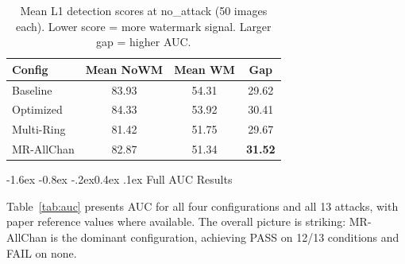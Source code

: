 \documentclass[10pt,twocolumn]{article}
\makeatletter
\renewcommand\subsection{\@startsection{subsection}{2}{\z@}%
  {-1.6ex \@plus -0.8ex \@minus -.2ex}{0.4ex \@plus .1ex}%
  {\normalfont\normalsize\itshape}}
\makeatother
\begin{document}
\begin{table}[htbp]
  \centering
  \caption{Mean L1 detection scores at no\_attack (50 images each).
    Lower score = more watermark signal. Larger gap = higher AUC.}
  \label{tab:scores}
  \setlength{\tabcolsep}{4pt}
  \small
  \begin{tabular}{lccc}
    \toprule
    \textbf{Config} & \textbf{Mean NoWM} & \textbf{Mean WM} & \textbf{Gap} \\
    \midrule
    Baseline   & 83.93 & 54.31 & 29.62 \\
    Optimized  & 84.33 & 53.92 & 30.41 \\
    Multi-Ring & 81.42 & 51.75 & 29.67 \\
    MR-AllChan & 82.87 & 51.34 & \textbf{31.52} \\
    \bottomrule
  \end{tabular}
\end{table}

\subsection{Full AUC Results}

Table~\ref{tab:auc} presents AUC for all four configurations and all
13 attacks, with paper reference values where available.
The overall picture is striking: MR-AllChan is the dominant configuration,
achieving PASS on 12/13 conditions and FAIL on none.
\end{document}
